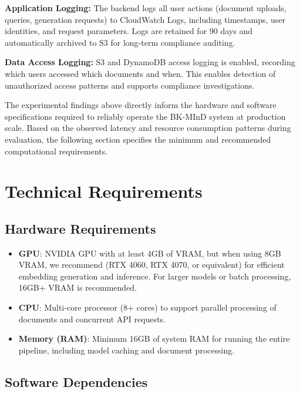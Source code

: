 \textbf{Application Logging:} The backend logs all user actions (document uploads, queries, generation requests) to CloudWatch Logs, including timestamps, user identities, and request parameters. Logs are retained for 90 days and automatically archived to S3 for long-term compliance auditing.

\textbf{Data Access Logging:} S3 and DynamoDB access logging is enabled, recording which users accessed which documents and when. This enables detection of unauthorized access patterns and supports compliance investigations.

The experimental findings above directly inform the hardware and software specifications required to reliably operate the BK-MInD system at production scale. Based on the observed latency and resource consumption patterns during evaluation, the following section specifies the minimum and recommended computational requirements.

\section{Technical Requirements}

\subsection{Hardware Requirements}

\begin{itemize}
    \item \textbf{GPU}: NVIDIA GPU with at least 4GB of VRAM, but when using 8GB VRAM, we recommend (RTX 4060, RTX 4070, or equivalent) for efficient embedding generation and inference. For larger models or batch processing, 16GB+ VRAM is recommended.
    \item \textbf{CPU}: Multi-core processor (8+ cores) to support parallel processing of documents and concurrent API requests.
    \item \textbf{Memory (RAM)}: Minimum 16GB of system RAM for running the entire pipeline, including model caching and document processing.
\end{itemize}

\subsection{Software Dependencies}

